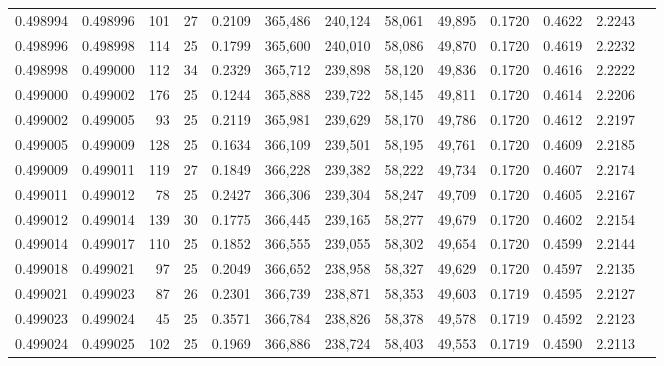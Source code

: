 \begin{tabular}{rrrrrrrrrrrrr}
0.498994 & 0.498996 & 101 &  27 &                                     0.2109 & 365,486 & 240,124 &  58,061 &  49,895 & 0.1720 & 0.4622 & 2.2243 \\
0.498996 & 0.498998 & 114 &  25 &                                     0.1799 & 365,600 & 240,010 &  58,086 &  49,870 & 0.1720 & 0.4619 & 2.2232 \\
0.498998 & 0.499000 & 112 &  34 &                                     0.2329 & 365,712 & 239,898 &  58,120 &  49,836 & 0.1720 & 0.4616 & 2.2222 \\
0.499000 & 0.499002 & 176 &  25 &                                     0.1244 & 365,888 & 239,722 &  58,145 &  49,811 & 0.1720 & 0.4614 & 2.2206 \\
0.499002 & 0.499005 &  93 &  25 &                                     0.2119 & 365,981 & 239,629 &  58,170 &  49,786 & 0.1720 & 0.4612 & 2.2197 \\
0.499005 & 0.499009 & 128 &  25 &                                     0.1634 & 366,109 & 239,501 &  58,195 &  49,761 & 0.1720 & 0.4609 & 2.2185 \\
0.499009 & 0.499011 & 119 &  27 &                                     0.1849 & 366,228 & 239,382 &  58,222 &  49,734 & 0.1720 & 0.4607 & 2.2174 \\
0.499011 & 0.499012 &  78 &  25 &                                     0.2427 & 366,306 & 239,304 &  58,247 &  49,709 & 0.1720 & 0.4605 & 2.2167 \\
0.499012 & 0.499014 & 139 &  30 &                                     0.1775 & 366,445 & 239,165 &  58,277 &  49,679 & 0.1720 & 0.4602 & 2.2154 \\
0.499014 & 0.499017 & 110 &  25 &                                     0.1852 & 366,555 & 239,055 &  58,302 &  49,654 & 0.1720 & 0.4599 & 2.2144 \\
0.499018 & 0.499021 &  97 &  25 &                                     0.2049 & 366,652 & 238,958 &  58,327 &  49,629 & 0.1720 & 0.4597 & 2.2135 \\
0.499021 & 0.499023 &  87 &  26 &                                     0.2301 & 366,739 & 238,871 &  58,353 &  49,603 & 0.1719 & 0.4595 & 2.2127 \\
0.499023 & 0.499024 &  45 &  25 &                                     0.3571 & 366,784 & 238,826 &  58,378 &  49,578 & 0.1719 & 0.4592 & 2.2123 \\
0.499024 & 0.499025 & 102 &  25 &                                     0.1969 & 366,886 & 238,724 &  58,403 &  49,553 & 0.1719 & 0.4590 & 2.2113 \\

\end{tabular}
